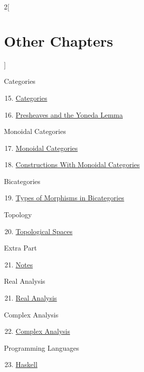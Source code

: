 \begin{multicols}{2}[\section{Other Chapters}]
\begin{enumerate}
\end{enumerate}
Categories
\begin{enumerate}
\setcounter{enumi}{14}
\item \hyperref[categories:section-phantom]{Categories}
\item \hyperref[presheaves-and-the-yoneda-lemma:section-phantom]{Presheaves and the Yoneda Lemma}
\end{enumerate}
Monoidal Categories
\begin{enumerate}
\setcounter{enumi}{16}
\item \hyperref[monoidal-categories:section-phantom]{Monoidal Categories}
\item \hyperref[constructions-with-monoidal-categories:section-phantom]{Constructions With Monoidal Categories}
\end{enumerate}
Bicategories
\begin{enumerate}
\setcounter{enumi}{18}
\item \hyperref[types-of-morphisms-in-bicategories:section-phantom]{Types of Morphisms in Bicategories}
\end{enumerate}
Topology
\begin{enumerate}
\setcounter{enumi}{19}
\item \hyperref[topological-spaces:section-phantom]{Topological Spaces}
\end{enumerate}
Extra Part
\begin{enumerate}
\setcounter{enumi}{20}
\item \hyperref[notes:section-phantom]{Notes}
\end{enumerate}
Real Analysis
\begin{enumerate}
\setcounter{enumi}{20}
\item \hyperref[real-analysis:section-phantom]{Real Analysis}
\end{enumerate}
Complex Analysis
\begin{enumerate}
\setcounter{enumi}{21}
\item \hyperref[complex-analysis:section-phantom]{Complex Analysis}
\end{enumerate}
Programming Languages
\begin{enumerate}
\setcounter{enumi}{22}
\item \hyperref[haskell:section-phantom]{Haskell}
\end{enumerate}
\end{multicols}

